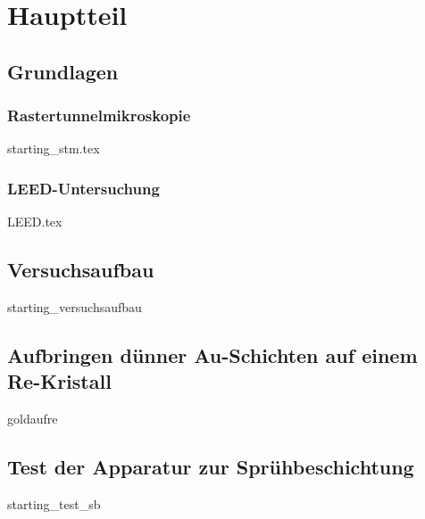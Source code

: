 \documentclass[a4paper,11pt,oneside,final,german,openbib,pdftex]{scrbook}
\begin{document}
\chapter{Hauptteil}


\section{Grundlagen}

% 
\subsection{Rastertunnelmikroskopie}
{starting_stm.tex}
 \subsection{LEED-Untersuchung}
 {LEED.tex}


 \section{Versuchsaufbau} 
 {starting_versuchsaufbau}
 
\section{Aufbringen dünner Au-Schichten auf einem Re-Kristall}
{goldaufre}
 
\section{Test der Apparatur zur Sprühbeschichtung} \label{kaptest}
{starting_test_sb}



% 
\end{document}
